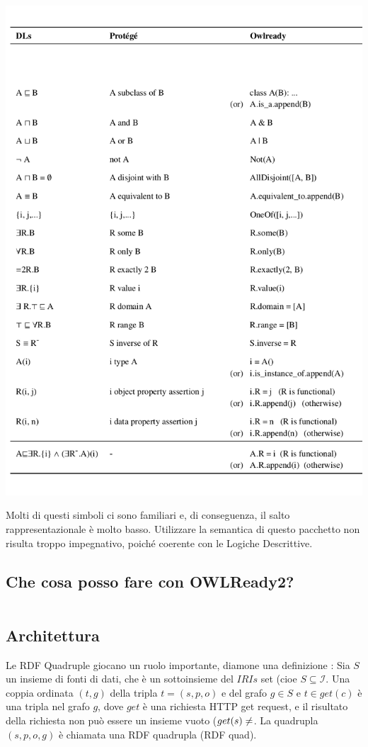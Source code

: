 \includegraphics[width=\linewidth]{immagini/ConversionTable.png}

Molti di questi simboli ci sono familiari e, di conseguenza, 
il salto rappresentazionale è molto basso.
Utilizzare la semantica di questo pacchetto non risulta troppo impegnativo, poiché coerente
con le Logiche Descrittive.

\subsection{Che cosa posso fare con OWLReady2?}
\inputminted{Python}{codice/IntroOwlReady2.py}

\subsection{Architettura}
Le RDF Quadruple giocano un ruolo importante, diamone una definizione : 
Sia $ S $ un insieme di fonti di dati, che è un sottoinsieme del $ IRIs $ set (cioe $ S \subseteq \mathcal{I} $. Una coppia ordinata $ (t,g) $ della tripla $ t = (s,p,o) $ e del
grafo $ g \in S $ e $ t \in get(c) $ è una tripla nel grafo $ g $, dove $ get $ è una richiesta HTTP get request, e il risultato della richiesta non può essere un insieme vuoto 
($ get(s) \not = \empty $. La quadrupla $ (s,p,o,g) $ è chiamata una RDF quadrupla (RDF quad).


